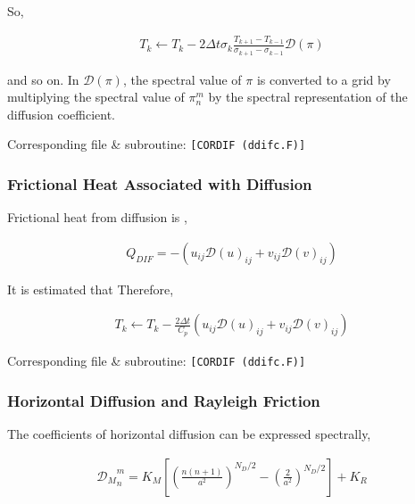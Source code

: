 So,

\begin{eqnarray}
  T_k \leftarrow  T_k
       -  2 \Delta t
        \sigma_{k} \frac{T_{k+1}-T_{k-1}}{\sigma_{k+1} - \sigma_{k-1}}
        {\mathcal D}(\pi)
\end{eqnarray}

and so on. In \({\mathcal D}(\pi)\), the spectral value of \(\pi\) is
converted to a grid by multiplying the spectral value of \(\pi_n^m\) by
the spectral representation of the diffusion coefficient.

Corresponding file \& subroutine: \texttt{{[}CORDIF\ (ddifc.F){]}}

\hypertarget{frictional-heat-associated-with-diffusion}{%
\subsubsection{Frictional Heat Associated with
Diffusion}\label{frictional-heat-associated-with-diffusion}}

Frictional heat from diffusion is ,

\begin{eqnarray}
  Q_{DIF} = - \left( u_{ij} {\mathcal D}(u)_{ij}
                   + v_{ij} {\mathcal D}(v)_{ij} \right)
\end{eqnarray}

It is estimated that Therefore,

\begin{eqnarray}
  T_k \leftarrow  T_k
       -  \frac{2 \Delta t}{C_p}
           \left( u_{ij} {\mathcal D}(u)_{ij}
                 + v_{ij} {\mathcal D}(v)_{ij} \right)
\end{eqnarray}

Corresponding file \& subroutine: \texttt{{[}CORDIF\ (ddifc.F){]}}

\hypertarget{horizontal-diffusion-and-rayleigh-friction}{%
\subsubsection{Horizontal Diffusion and Rayleigh
Friction}\label{horizontal-diffusion-and-rayleigh-friction}}

The coefficients of horizontal diffusion can be expressed spectrally,

\begin{eqnarray}
 {{\mathcal D}_M}_n^m = K_M
                      \left[ \left( \frac{n(n+1)}{a^2} \right)^{N_D/2}
                                - \left( \frac{2}{a^2} \right)^{N_D/2}
                      \right]
                  + K_R
\end{eqnarray}

